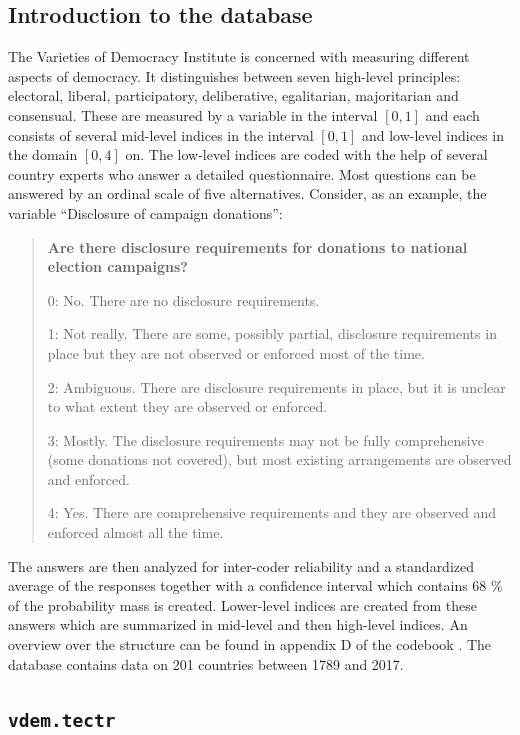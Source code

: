 \documentclass[]{report}
\theoremstyle{definition}
\theoremstyle{definition}
\theoremstyle{definition}
\theoremstyle{remark}
\begin{document}
\subsection{Introduction to the
database}\label{introduction-to-the-database}

The Varieties of Democracy Institute is concerned with measuring
different aspects of democracy. It distinguishes between seven
high-level principles: electoral, liberal, participatory, deliberative,
egalitarian, majoritarian and consensual. These are measured by a
variable in the interval \([0,1]\) and each consists of several
mid-level indices in the interval \([0,1]\) and low-level indices in the
domain \([0,4]\) on. The low-level indices are coded with the help of
several country experts who answer a detailed questionnaire. Most
questions can be answered by an ordinal scale of five alternatives.
Consider, as an example, the variable ``Disclosure of campaign
donations'':

\begin{quote}
\textbf{Are there disclosure requirements for donations to national
election campaigns?}

0: No. There are no disclosure requirements.

1: Not really. There are some, possibly partial, disclosure requirements
in place but they are not observed or enforced most of the time.

2: Ambiguous. There are disclosure requirements in place, but it is
unclear to what extent they are observed or enforced.

3: Mostly. The disclosure requirements may not be fully comprehensive
(some donations not covered), but most existing arrangements are
observed and enforced.

4: Yes. There are comprehensive requirements and they are observed and
enforced almost all the time.
\end{quote}

The answers are then analyzed for inter-coder reliability and a
standardized average of the responses together with a confidence
interval which contains 68 \% of the probability mass is created.
Lower-level indices are created from these answers which are summarized
in mid-level and then high-level indices. An overview over the structure
can be found in appendix D of the codebook \citep{vdem-codebook2018}.
The database contains data on 201 countries between 1789 and 2017.
\citep[\citet{Pemstein2018}]{vdem2018}

\subsection{\texorpdfstring{\texttt{vdem.tectr}}{vdem.tectr}}\label{vdem.tectr}
\end{document}
